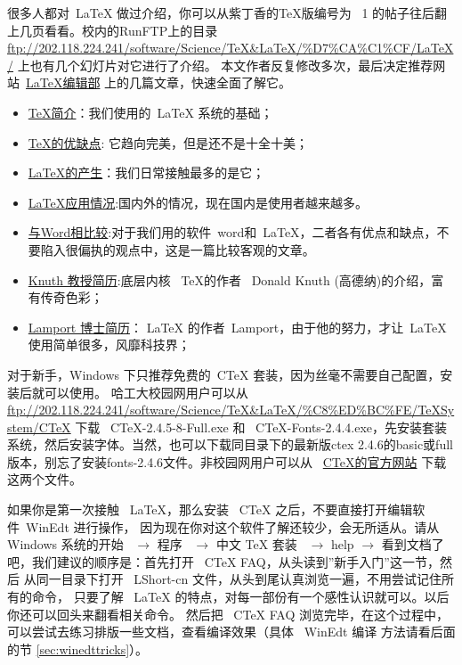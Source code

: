     很多人都对~\LaTeX{} 做过介绍，你可以从紫丁香的TeX版编号为~ 1 的帖子往后翻上几页看看。校内的RunFTP上的目录
    \url{ftp://202.118.224.241/software/Science/TeX&LaTeX/\%D7\%CA\%C1\%CF/LaTeX/} 上也有几个幻灯片对它进行了介绍。
    本文作者反复修改多次，最后决定推荐网站~\href{http://zzg34b.w3.c361.com/index.htm}{LaTeX编辑部} 上的几篇文章，快速全面了解它。
   \begin{itemize}
     \item  \href{http://learn.tsinghua.edu.cn:8080/2001315450/tex_frame.html}{TeX简介}：我们使用的~\LaTeX{} 系统的基础；
     \item \href{http://zzg34b.w3.c361.com/homepage/TeXvirtue.htm}{TeX的优缺点}: 它趋向完美，但是还不是十全十美；
     \item \href{http://zzg34b.w3.c361.com/homepage/LaTeXbring.htm}{LaTeX的产生}：我们日常接触最多的是它；
     \item \href{http://zzg34b.w3.c361.com/homepage/compareWord.htm}{LaTeX应用情况}:国内外的情况，现在国内是使用者越来越多。
     \item \href{http://zzg34b.w3.c361.com/homepage/compareWord.htm}{与Word相比较}:对于我们用的软件~word和~LaTeX，二者各有优点和缺点，不要陷入很偏执的观点中，这是一篇比较客观的文章。
     \item \href{http://zzg34b.w3.c361.com/homepage/KnuthResume.htm}{Knuth 教授简历}:底层内核~ \TeX 的作者~ Donald Knuth (高德纳)的介绍，富有传奇色彩；
     \item \href{http://zzg34b.w3.c361.com/homepage/LamportResume.htm}{Lamport 博士简历}： \LaTeX{} 的作者~Lamport，由于他的努力，才让~\LaTeX{} 使用简单很多，风靡科技界；
   \end{itemize}

\label{sec:latexsoftware}

对于新手，Windows 下只推荐免费的~CTeX 套装，因为丝毫不需要自己配置，安装后就可以使用。
哈工大校园网用户可以从~ \url{ftp://202.118.224.241/software/Science/TeX&LaTeX/\%C8\%ED\%BC\%FE/TeXSystem/CTeX} 下载~
CTeX-2.4.5-8-Full.exe 和~ CTeX-Fonts-2.4.4.exe，先安装套装系统，然后安装字体。当然，也可以下载同目录下的最新版ctex 2.4.6的basic或full
版本，别忘了安装fonts-2.4.6文件。非校园网用户可以从~ \href{http://www.ctex.org}{CTeX的官方网站} 下载这两个文件。


如果你是第一次接触~ LaTeX，那么安装~ CTeX 之后，不要直接打开编辑软件~WinEdt 进行操作，
因为现在你对这个软件了解还较少，会无所适从。请从~ Windows
系统的开始~ $\rightarrow$ 程序~ $\rightarrow$ 中文 TeX 套装~ $\rightarrow$ help $\rightarrow$
看到文档了吧，我们建议的顺序是：首先打开~ CTeX FAQ，从头读到''新手入门''这一节，然后
从同一目录下打开~ LShort-cn 文件，从头到尾认真浏览一遍，不用尝试记住所有的命令，
只要了解~ LaTeX 的特点，对每一部份有一个感性认识就可以。以后你还可以回头来翻看相关命令。
然后把 ~CTeX FAQ 浏览完毕，在这个过程中，可以尝试去练习排版一些文档，查看编译效果（具体~ WinEdt 编译
方法请看后面的节 \ref{sec:winedttricks}）。

